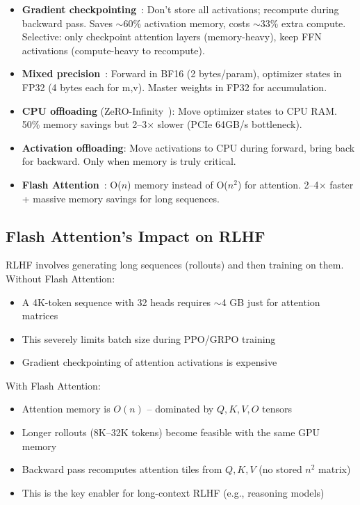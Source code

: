 \begin{itemize}
  \item \textbf{Gradient checkpointing}~\cite{chen2016training}: Don’t store all activations; recompute during backward pass. Saves $\sim$60\% activation memory, costs $\sim$33\% extra compute. Selective: only checkpoint attention layers (memory-heavy), keep FFN activations (compute-heavy to recompute).
  \item \textbf{Mixed precision}~\cite{micikevicius2018mixed}: Forward in BF16 (2 bytes/param), optimizer states in FP32 (4 bytes each for m,v). Master weights in FP32 for accumulation.
  \item \textbf{CPU offloading} (ZeRO-Infinity~\cite{rajbhandari2021zeroinfinity}): Move optimizer states to CPU RAM. 50\% memory savings but 2--3$\times$ slower (PCIe 64GB/s bottleneck).
  \item \textbf{Activation offloading}: Move activations to CPU during forward, bring back for backward. Only when memory is truly critical.
  \item \textbf{Flash Attention}~\cite{dao2022flashattention, dao2023flashattention2}: O($n$) memory instead of O($n^2$) for attention. 2--4$\times$ faster + massive memory savings for long sequences.
\end{itemize}

\subsection{Flash Attention’s Impact on RLHF}
\label{flash-attentions-impact-on-rlhf}

\begin{intuitionbox}
RLHF involves generating long sequences (rollouts) and then training on them. Without Flash Attention:

\begin{itemize}
  \item A 4K-token sequence with 32 heads requires $\sim$4 GB just for attention matrices
  \item This severely limits batch size during PPO/GRPO training
  \item Gradient checkpointing of attention activations is expensive
\end{itemize}

With Flash Attention:

\begin{itemize}
  \item Attention memory is $O(n)$ -- dominated by $Q, K, V, O$ tensors
  \item Longer rollouts (8K--32K tokens) become feasible with the same GPU memory
  \item Backward pass recomputes attention tiles from $Q, K, V$ (no stored $n^2$ matrix)
  \item This is the key enabler for long-context RLHF (e.g., reasoning models)
\end{itemize}
\end{intuitionbox}

